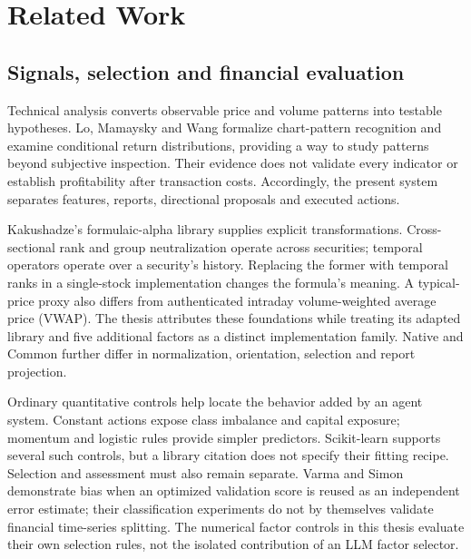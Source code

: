 \chapter{Related Work}\label{s:9827c64bef49c4b1}
\section{Signals, selection and financial evaluation}\label{s:14b05e24677e26cb}
Technical analysis converts observable price and volume patterns into
testable hypotheses. Lo, Mamaysky and Wang formalize chart-pattern
recognition and examine conditional return distributions, providing a
way to study patterns beyond subjective inspection. Their evidence does
not validate every indicator or establish profitability after transaction
costs. \autocite{lo2000technical} Accordingly, the present system separates
features, reports, directional proposals and executed actions.

Kakushadze's formulaic-alpha library supplies explicit transformations.
Cross-sectional rank and group neutralization operate across securities;
temporal operators operate over a security's history. Replacing the
former with temporal ranks in a single-stock implementation changes the
formula's meaning. A typical-price proxy also differs from authenticated
intraday volume-weighted average price (VWAP). \autocite{kakushadze2016formulaic} The thesis attributes
these foundations while treating its adapted library and five additional
factors as a distinct implementation family. Native and Common further
differ in normalization, orientation, selection and report projection.

Ordinary quantitative controls help locate the behavior added by an agent
system. Constant actions expose class imbalance and capital exposure;
momentum and logistic rules provide simpler predictors. Scikit-learn
supports several such controls, but a library citation does not specify
their fitting recipe. \autocite{pedregosa2011sklearn} Selection and
assessment must also remain separate. Varma and Simon demonstrate bias
when an optimized validation score is reused as an independent error
estimate; their classification experiments do not by themselves validate
financial time-series splitting. \autocite{varma2006bias} The numerical
factor controls in this thesis evaluate their own selection rules, not
the isolated contribution of an LLM factor selector.

